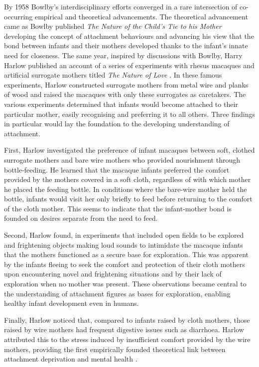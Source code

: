 \documentclass[12pt]{report}
\begin{document}
By 1958 Bowlby's interdisciplinary efforts converged in a rare intersection of co-occurring empirical and theoretical advancements. The theoretical advancement came as Bowlby published \textit{The Nature of the Child's Tie to his Mother} \cite{Bowlby1958} developing the concept of attachment behaviours and advancing his view that the bond between infants and their mothers developed thanks to the infant's innate need for closeness.
The same year, inspired by discussions with Bowlby, Harry Harlow published an account of a series of experiments with rhesus macaques and artificial surrogate mothers titled \textit{The Nature of Love} \cite{Harlow1958}.
In these famous experiments, Harlow constructed surrogate mothers from metal wire and planks of wood and raised the macaques with only these surrogates as caretakers. The various experiments determined that infants would become attached to their particular mother, easily recognising and preferring it to all others.
Three findings in particular would lay the foundation to the developing understanding of attachment.

First, Harlow investigated the preference of infant macaques between soft, clothed surrogate mothers and bare wire mothers who provided nourishment through bottle-feeding.
He learned that the macaque infants preferred the comfort provided by the mothers covered in a soft cloth, regardless of with which mother he placed the feeding bottle.
In conditions where the bare-wire mother held the bottle, infants would visit her only briefly to feed before returning to the comfort of the cloth mother.
This seems to indicate that the infant-mother bond is founded on desires separate from the need to feed.

Second, Harlow found, in experiments that included open fields to be explored and frightening objects making loud sounds to intimidate the macaque infants that the mothers functioned as a secure base for exploration.
This was apparent by the infants fleeing to seek the comfort and protection of their cloth mothers upon encountering novel and frightening situations and by their lack of exploration when no mother was present.
These observations became central to the understanding of attachment figures as bases for exploration, enabling healthy infant development even in humans.

Finally, Harlow noticed that, compared to infants raised by cloth mothers, those raised by wire mothers had frequent digestive issues such as diarrhoea. Harlow attributed this to the stress induced by insufficient comfort provided by the wire mothers, providing the first empirically founded theoretical link between attachment deprivation and mental health \cite{Harlow1958}.
\end{document}
